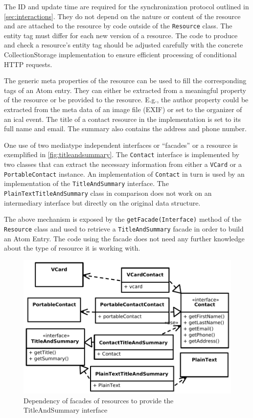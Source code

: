 \documentclass[11pt,a4paper,headsepline,twoside]{scrartcl}		%
\begin{document}
The ID and update time are required for the synchronization protocol outlined in
\autoref{sec:interactions}. They do not depend on the nature or content of the
resource and are attached to the resource by code outside of the
\lstinline:Resource: class. The entity tag must differ for each new version of a
resource. The code to produce and check a resource's entity tag should be
adjusted carefully with the concrete CollectionStorage implementation to ensure
efficient processing of conditional HTTP requests.

The generic meta properties of the resource can be used to fill the
corresponding tags of an Atom entry. They can either be extracted from a
meaningful property of the resource or be provided to the resource. E.g., the
author property could be extracted from the meta data of an image file (EXIF) or
set to the organizer of an ical event. The title of a contact resource in the
implementation is set to its full name and email. The summary also contains the
address and phone number.

One use of two mediatype independent interfaces or ``facades'' or a resource is
exemplified in \autoref{fig:titleandsummary}. The \lstinline:Contact: interface
is implemented by two classes that can extract the necessary information from
either a \lstinline:VCard: or a \lstinline:PortableContact: instance. An
implementation of \lstinline:Contact: in turn is used by an implementation of
the \lstinline:TitleAndSummary: interface. The
\lstinline:PlainTextTitleAndSummary: class in comparison does not work on an
intermediary interface but directly on the original data structure.

The above mechanism is exposed by the \lstinline:getFacade(Interface): method of
the \lstinline:Resource: class and used to retrieve a
\lstinline:TitleAndSummary: facade in order to build an Atom Entry. The code
using the facade does not need any further knowledge about the type of resource
it is working with.

\begin{figure}[htb]
  \centering
  \includegraphics[width=1\textwidth]{titleandsummary}

  \caption{Dependency of facades of resources to provide the TitleAndSummary interface}
  \label{fig:titleandsummary}
\end{figure}
\end{document}
